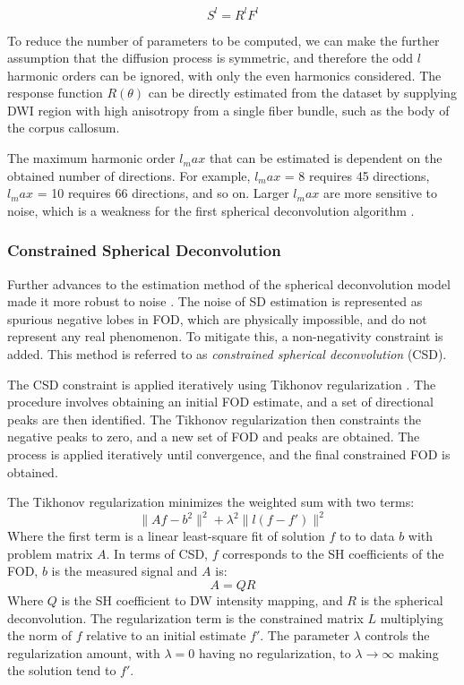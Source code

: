 \begin{equation}
S^l = R^l F^l
\end{equation}

To reduce the number of parameters to be computed, we can make the further assumption that the diffusion process is symmetric, and therefore the odd $l$ harmonic orders can be ignored, with only the even harmonics considered. 
The response function $R(\theta)$ can be directly estimated from the dataset by supplying DWI region with high anisotropy from a single fiber bundle, such as the body of the corpus callosum. 

The maximum harmonic order $l_max$ that can be estimated is dependent on the obtained number of directions. For example, $l_max$ = 8 requires 45 directions, $l_max$ = 10 requires 66 directions, and so on. Larger $l_max$ are more sensitive to noise, which is a weakness for the first spherical deconvolution algorithm \cite{Tournier2004}. 

\subsubsection{Constrained Spherical Deconvolution}
Further advances to the estimation method of the spherical deconvolution model made it more robust to noise \cite{Tournier2007b}. The noise of SD estimation is represented as spurious negative lobes in FOD, which are physically impossible, and do not represent any real phenomenon. To mitigate this, a non-negativity constraint is added. This method is referred to as \textit{constrained spherical deconvolution} (CSD). 

The CSD constraint is applied iteratively using Tikhonov regularization \cite{Hansen1998}. The procedure involves obtaining an initial FOD estimate, and a set of directional peaks are then identified. The Tikhonov regularization then constraints the negative peaks to zero, and a new set of FOD and peaks are obtained. The process is applied iteratively until convergence, and the final constrained FOD is obtained. 

The Tikhonov regularization minimizes the weighted sum with two terms:
\begin{equation}
\|{Af - b}^2\|^2 + \lambda^2 \| l(f - f')\|^2
\end{equation}
Where the first term is a linear least-square fit of solution $f$ to to data $b$ with problem matrix $A$. 
In terms of CSD, $f$ corresponds to the SH coefficients of the FOD, $b$ is the measured signal and $A$ is:
\begin{equation}
A = QR
\end{equation}
Where $Q$ is the SH coefficient to DW intensity mapping, and $R$ is the spherical deconvolution. 
The regularization term is the constrained matrix $L$ multiplying the norm of $f$ relative to an initial estimate $f'$. The parameter $\lambda$ controls the regularization amount, with $\lambda=0$ having no regularization, to $\lambda\rightarrow \infty $ making the solution tend to $f'$. 


